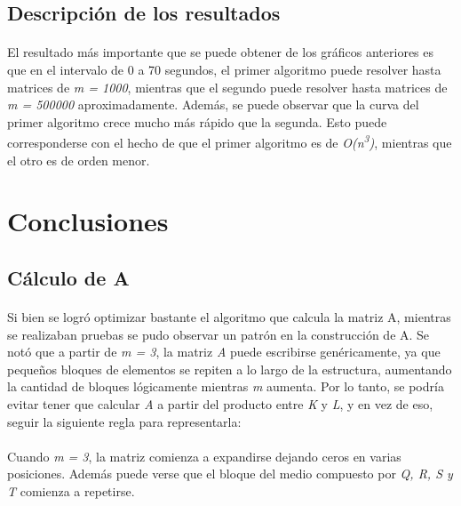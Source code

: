 \documentclass[a4paper,11pt]{article}
\begin{document}
\subsection{Descripci\'on de los resultados}
\paragraph{}
El resultado m\'as importante que se puede obtener de los gr\'aficos anteriores
es que en el intervalo de 0 a 70 segundos, el primer algoritmo puede resolver
hasta matrices de \emph{m = 1000}, mientras que el segundo puede resolver hasta
matrices de \emph{m = 500000} aproximadamente.  Adem\'as, se puede observar que
la curva del primer algoritmo crece mucho m\'as r\'apido que la segunda. Esto
puede corresponderse con el hecho de que el primer algoritmo es de
\emph{O(n\textsuperscript{3})}, mientras que el otro es de orden menor.

\newpage
\section{Conclusiones}
\subsection{C\'alculo de A}
\paragraph{}
Si bien se logr\'o optimizar bastante el algoritmo que calcula la matriz A,
mientras se realizaban pruebas se pudo observar un patr\'on en la
construcci\'on de A. Se not\'o que a partir de \emph{m = 3}, la matriz \emph{A}
puede escribirse gen\'ericamente, ya que pequeños bloques de elementos se
repiten a lo largo de la estructura, aumentando la cantidad de bloques
l\'ogicamente mientras \emph{m} aumenta. Por lo tanto, se podr\'ia evitar tener
que calcular \emph{A} a partir del producto entre \emph{K} y \emph{L}, y en vez
de eso, seguir la siguiente regla para representarla:

\paragraph{}
\paragraph{}
\paragraph{}
Cuando \emph{m = 3}, la matriz comienza a expandirse dejando ceros en varias
posiciones. Adem\'as puede verse que el bloque del medio compuesto por \emph{Q,
R, S y T} comienza a repetirse.
\end{document}
